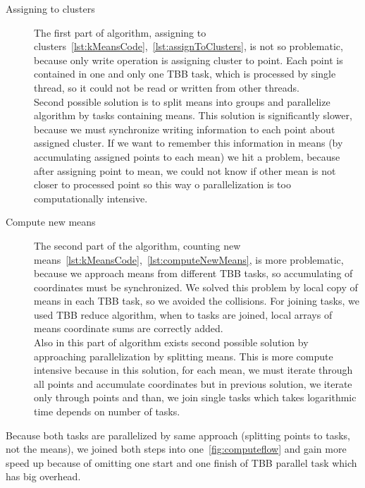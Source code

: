 \begin{description}
\item[Assigning to clusters]The first part of algorithm, assigning to clusters~\autoref{lst:kMeansCode},~\autoref{lst:assignToClusters}, is not so problematic, because only write operation is assigning cluster to point. Each point is contained in one and only one TBB task, which is processed by single thread, so it could not be read or written from other threads.\\
Second possible solution is to split means into groups and parallelize algorithm by tasks containing means. This solution is significantly slower, because we must synchronize writing information to each point about assigned cluster. If we want to remember this information in means (by accumulating assigned points to each mean) we hit a problem, because after assigning point to mean, we could not know if other mean is not closer to processed point so this way o parallelization is too computationally intensive.\\
\item[Compute new means]The second part of the algorithm, counting new means~\autoref{lst:kMeansCode},~\autoref{lst:computeNewMeans}, is more problematic, because we approach means from different TBB tasks, so accumulating of coordinates must be synchronized. We solved this problem by local copy of means in each TBB task, so we avoided the collisions. For joining tasks, we used TBB reduce algorithm, when to tasks are joined, local arrays of means coordinate sums are correctly added.\\
Also in this part of algorithm exists second possible solution by approaching parallelization by splitting means. This is more compute intensive because in this solution, for each mean, we must iterate through all points and accumulate coordinates but in previous solution, we iterate only through points and than, we join single tasks which takes logarithmic time depends on number of tasks.
\end{description}
Because both tasks are parallelized by same approach (splitting points to tasks, not the means), we joined both steps into one~\autoref{fig:computeflow} and gain more speed up because of omitting one start and one finish of TBB parallel task which has big overhead.
